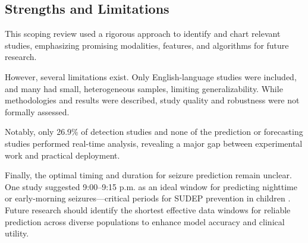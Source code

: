 \subsection{Strengths and Limitations}
This scoping review used a rigorous approach to identify and chart relevant studies, emphasizing promising modalities, features, and algorithms for future research.

However, several limitations exist. Only English-language studies were included, and many had small, heterogeneous samples, limiting generalizability. While methodologies and results were described, study quality and robustness were not formally assessed.

Notably, only 26.9\% of detection studies \cite{De_Cooman2018-pq,Chowdhury2022-bi,Ali2020-ke,Wang2025-ql,Hegarty-Craver2021-hk,Arends2018-ew,Jiang2022-zu} and none of the prediction or forecasting studies performed real-time analysis, revealing a major gap between experimental work and practical deployment.

Finally, the optimal timing and duration for seizure prediction remain unclear. One study \cite{Vieluf2023-zv} suggested 9:00–9:15 p.m. as an ideal window for predicting nighttime or early-morning seizures—critical periods for SUDEP prevention in children \cite{Trivisano2022-zw}. Future research should identify the shortest effective data windows for reliable prediction across diverse populations to enhance model accuracy and clinical utility.
